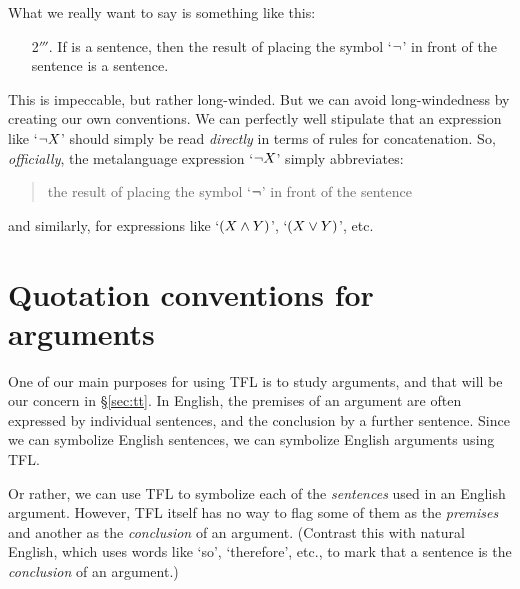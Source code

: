 What we really want to say is something like this:
	\begin{itemize}
		\item[2$'''$.] If \metaX is a sentence, then the result of placing the symbol `$\neg$' in front of the sentence \metaX is a sentence.
	\end{itemize}
	This is impeccable, but rather long-winded. %
But we can avoid long-windedness by creating our own conventions. We can perfectly well stipulate that an expression like `$\neg X$' should simply be read \emph{directly} in terms of rules for concatenation. So, \emph{officially}, the metalanguage expression `$\neg X$'
simply abbreviates:
\begin{quote}
	the result of placing the symbol `$\neg$' in front of the sentence \metaX
\end{quote}
and similarly, for expressions like `$(X \mathbin{\wedge} Y)$', `$(X \vee Y)$', etc.


\section{Quotation conventions for arguments}
One of our main purposes for using TFL is to study arguments, and that will be our concern in \S\ref{sec:tt}. In English, the premises of an argument are often expressed by individual sentences, and the conclusion by a further sentence. Since we can symbolize English sentences, we can symbolize English arguments using TFL.

Or rather, we can use TFL to symbolize each of the \emph{sentences} used in an English argument. However, TFL itself has no way to flag some of them as the \emph{premises} and another as the \emph{conclusion} of an argument.  (Contrast this with natural English, which uses words like `so', `therefore', etc., to mark that a sentence is the \emph{conclusion} of an argument.)


